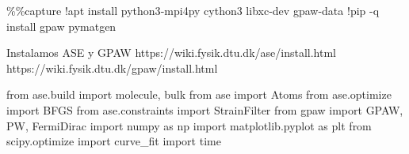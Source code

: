 \documentclass[
  letterpaper,
  DIV=11,
  numbers=noendperiod]{scrreprt}
\newenvironment{Shaded}{\begin{snugshade}}{\end{snugshade}}
\newcommand{\ImportTok}[1]{\textcolor[rgb]{0.00,0.46,0.62}{#1}}
\newcommand{\NormalTok}[1]{\textcolor[rgb]{0.00,0.23,0.31}{#1}}
\newcommand{\OperatorTok}[1]{\textcolor[rgb]{0.37,0.37,0.37}{#1}}
\begin{document}
\begin{Shaded}
\begin{Highlighting}[]
\OperatorTok{\%\%}\NormalTok{capture}
\OperatorTok{!}\NormalTok{apt install python3}\OperatorTok{{-}}\NormalTok{mpi4py cython3 libxc}\OperatorTok{{-}}\NormalTok{dev gpaw}\OperatorTok{{-}}\NormalTok{data}
\OperatorTok{!}\NormalTok{pip }\OperatorTok{{-}}\NormalTok{q install gpaw pymatgen}
\end{Highlighting}
\end{Shaded}

Instalamos ASE y GPAW https://wiki.fysik.dtu.dk/ase/install.html
https://wiki.fysik.dtu.dk/gpaw/install.html

\begin{Shaded}
\begin{Highlighting}[]
\ImportTok{from}\NormalTok{ ase.build }\ImportTok{import}\NormalTok{ molecule, bulk}
\ImportTok{from}\NormalTok{ ase }\ImportTok{import}\NormalTok{ Atoms}
\ImportTok{from}\NormalTok{ ase.optimize }\ImportTok{import}\NormalTok{ BFGS}
\ImportTok{from}\NormalTok{ ase.constraints }\ImportTok{import}\NormalTok{ StrainFilter}
\ImportTok{from}\NormalTok{ gpaw }\ImportTok{import}\NormalTok{ GPAW, PW, FermiDirac}
\ImportTok{import}\NormalTok{ numpy }\ImportTok{as}\NormalTok{ np}
\ImportTok{import}\NormalTok{ matplotlib.pyplot }\ImportTok{as}\NormalTok{ plt}
\ImportTok{from}\NormalTok{ scipy.optimize }\ImportTok{import}\NormalTok{ curve\_fit}
\ImportTok{import}\NormalTok{ time}
\end{Highlighting}
\end{Shaded}
\end{document}
